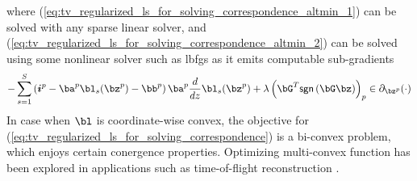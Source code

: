 \documentclass[../writeup.tex]{subfiles}
\begin{document}
where (\ref{eq:tv_regularized_ls_for_solving_correspondence_altmin_1}) can be solved with any sparse linear solver, and (\ref{eq:tv_regularized_ls_for_solving_correspondence_altmin_2}) can be solved using some nonlinear solver such as lbfgs as it emits computable sub-gradients 
\begin{align}
     -\sum_{s=1}^S 
            \left( \si^p - \ba^p \bl_s(\bz^p) - \bb^p \right) \ba^p \frac{d}{dz} \bl_s(\bz^p)
            + \lambda \left( \bG^T \textsf{sgn}\left( \bG \bz \right) \right)_p
        \in \partial_{\bz^p}(\cdot)
    \label{eq:tv_regularized_ls_for_solving_correspondence_altmin_1_gradient}
\end{align}
In case when $\bl$ is coordinate-wise convex, the objective for (\ref{eq:tv_regularized_ls_for_solving_correspondence}) is a bi-convex problem, which enjoys certain conergence properties. Optimizing multi-convex function has been explored in applications such as time-of-flight reconstruction \cite{heideNonlineofsightImagingPartial2017}.
 




\end{document}
